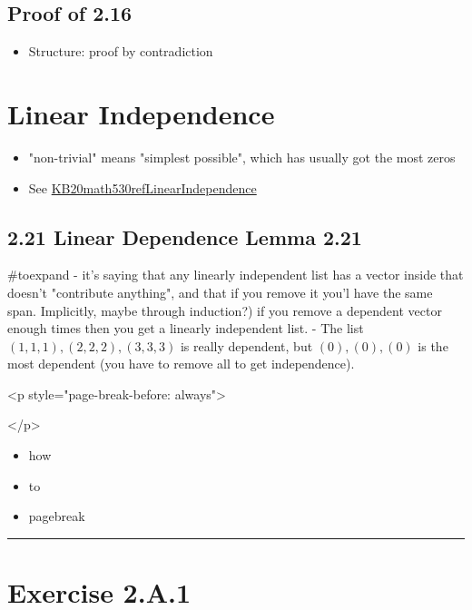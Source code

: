 \documentclass[letterpaper]{article}
\begin{document}
\subsection{Proof of 2.16}
\label{sec:org1c7e07a}
\begin{itemize}
\item Structure: proof by contradiction
\end{itemize}

\section{Linear Independence}
\label{sec:org84119ff}
\begin{itemize}
\item "non-trivial" means "simplest possible", which has usually got the
most zeros
\item See
\href{KB20math530refLinearIndependence.org}{KB20math530refLinearIndependence}
\end{itemize}

\subsection{2.21 Linear Dependence Lemma 2.21}
\label{sec:org067fae7}
\#toexpand - it's saying that any linearly independent list has a vector
inside that doesn't "contribute anything", and that if you remove it
you'l have the same span. Implicitly, maybe through induction?) if you
remove a dependent vector enough times then you get a linearly
independent list. - The list \((1, 1, 1), (2, 2, 2), (3, 3, 3)\) is
really dependent, but \((0), (0), (0)\) is the most dependent (you have
to remove all to get independence).

\begin{html}
<p style="page-break-before: always">
\end{html}

\begin{html}
</p>
\end{html}

\begin{itemize}
\item how
\item to
\item pagebreak
\end{itemize}

\noindent\rule{\textwidth}{0.5pt}

\section{Exercise 2.A.1}
\label{sec:org7672df5}
\end{document}
